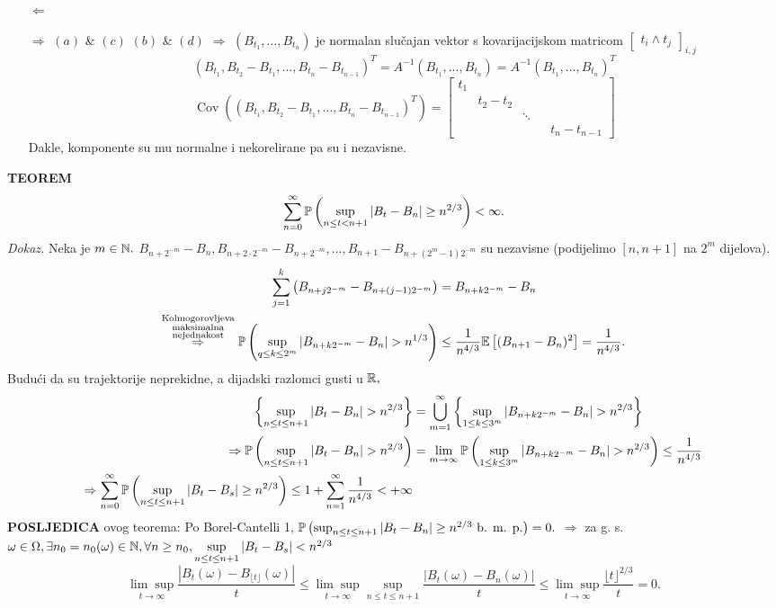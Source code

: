 \documentclass{article}
\newcommand{\Cov}{\operatorname{Cov}}
\begin{document}
\begin{enumerate}
    \item[\(\boxed{\Leftarrow}\)]
    \item[\(\boxed{\Rightarrow}\)]\((a)\) \& \((c)\) \newline \((b)\) \& \((d)\) \(\Rightarrow\) \((B_{t_1},\ldots,B_{t_n})\) je normalan slučajan vektor s kovarijacijskom matricom \(\begin{bmatrix}t_i\land t_j\end{bmatrix}_{i,j}\) \[\left(B_{t_1},B_{t_2}-B_{t_1},\ldots,B_{t_n}-B_{t_{n-1}}\right)^T=A^{-1}\left(B_{t_1},\ldots,B_{t_n}\right)=A^{-1}\left(B_{t_1},\ldots,B_{t_n}\right)^T\] \[\Cov\left(\left(B_{t_1},B_{t_2}-B_{t_1},\ldots,B_{t_n}-B_{t_{n-1}}\right)^T\right)=\begin{bmatrix}t_1&&&&\\&t_2-t_2&&&\\&&\ddots&&\\&&&&t_n-t_{n-1}\end{bmatrix}\] Dakle, komponente su mu normalne i nekorelirane pa su i nezavisne.
\end{enumerate}
\textbf{TEOREM}\[\sum_{n=0}^\infty\Bbb P\left(\sup_{n\le t<n+1}|B_t-B_n|\ge n^{2/3}\right)<\infty.\]
\textit{Dokaz.}\newline
Neka je \(m\in\Bbb N.\) \(B_{n+2^{-m}}-B_n,B_{n+2\cdot 2^{-m}}-B_{n+2^{-m}},\ldots,B_{n+1}-B_{n+(2^m-1)2^{-m}}\) su nezavisne (podijelimo \([n,n+1]\) na \(2^m\) dijelova). \[\begin{aligned}\sum_{j=1}^k\left(B_{n+j2^{-m}}-B_{n+(j-1)2^{-m}}\right)&=B_{n+k2^{-m}}-B_n\\\overset{\substack{\text{Kolmogorovljeva}\\\text{maksimalna}\\\text{nejednakost}}}{\Rightarrow}\Bbb P\left(\sup_{q\le k\le2^m}\left|B_{n+k2^{-m}}-B_n\right|>n^{1/3}\right)&\le\frac1{n^{4/3}}\Bbb E\left[(B_{n+1}-B_n)^2\right]=\frac1{n^{4/3}}.\end{aligned}\] Budući da su trajektorije neprekidne, a dijadski razlomci gusti u \(\Bbb R,\) \[\begin{aligned}\left\{\sup_{n\le t\le n+1}|B_t-B_n|>n^{2/3}\right\}&=\bigcup_{m=1}^\infty\left\{\sup_{1\le k\le 3^m}\left|B_{n+k2^{-m}}-B_n\right|>n^{2/3}\right\}\\\Rightarrow\Bbb P\left(\sup_{n\le t\le n+1}|B_t-B_n|>n^{2/3}\right)&=\lim_{m\to\infty}\Bbb P\left(\sup_{1\le k\le 3^m}\left|B_{n+k2^{-m}}-B_n\right|>n^{2/3}\right)\le\frac1{n^{4/3}}\\\Rightarrow\sum_{n=0}^\infty\Bbb P\left(\sup_{n\le t\le n+1}|B_t-B_s|\ge n^{2/3}\right)\le 1+\sum_{n=1}^\infty\frac1{n^{4/3}}<+\infty\end{aligned}\] \textbf{POSLJEDICA} ovog teorema: Po Borel-Cantelli 1, \(\Bbb P\left(\sup_{n\le t\le n+1}|B_t-B_n|\ge n^{2/3}\text{ b. m. p.}\right)=0.\) \(\Rightarrow\) za g. s. \(\omega\in\Omega,\exists n_0=n_0(\omega)\in\Bbb N,\forall n\ge n_0,\sup\limits_{n\le t\le n+1}|B_t-B_s|<n^{2/3}\) \[\underset{t\to\infty}{\lim\sup}\frac{\left|B_t(\omega)-B_{\lfloor t\rfloor}(\omega)\right|}t\le\underset{t\to\infty}{\lim\sup}\sup_{n\le t\le n+1}\frac{|B_t(\omega)-B_n(\omega)|}t\le\underset{t\to\infty}{\lim\sup}\frac{\lfloor t\rfloor^{2/3}}t=0.\]
\end{document}
